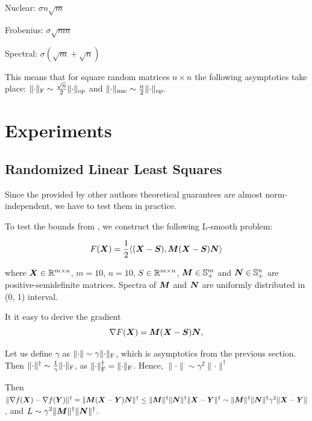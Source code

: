 \documentclass{article} %
\newcommand{\norm}[1]{\lVert #1\rVert}
\newcommand{\Rmn}{\R^{m\times n}}
\DeclarePairedDelimiter{\normf}{\|}{\|_\mathrm{F}}
\DeclarePairedDelimiter{\norms}{\|}{\|_{\mathrm{op}}}
\DeclarePairedDelimiter{\normn}{\|}{\|_{\mathrm{nuc}}}
\def\<#1,#2>{\langle #1,#2\rangle}
\begin{document}
    Nuclear: $\sigma n \sqrt{m}$

    Frobenius: $\sigma \sqrt{m n}$
    
    Spectral: $\sigma(\sqrt{m} + \sqrt{n})$

    This means that for square random matrices $n \times n$  the following asymptotics take place: $\normf{\cdot} \sim \frac{\sqrt{n}}{2}\norms{\cdot}$ and $\normn{\cdot} \sim \frac{n}{2}\norms{\cdot}$.


\section{Experiments}
    \subsection{Randomized Linear Least Squares}
    Since the provided by other authors \citep{kovalev2025understanding,riabinin2025gluon} theoretical guarantees are almost norm-independent, we have to test them in practice.

    To test the bounds from \citet{kovalev2025understanding}, we construct the following L-smooth problem:

    \begin{equation}\label{eq:lls}
        F(\mX) = \frac{1}{2} \<(\mX-\mS), \mM (\mX - \mS) \mN>
    \end{equation}

    where $\mX \in \Rmn$, $m=10$, $n=10$, $S \in \Rmn$, ${\bm{M}} \in \mathbb{S}^m_{+}$ and ${\bm{N}} \in \mathbb{S}^n_{+}$ are positive-semidefinite matrices. Spectra of ${\bm{M}}$ and ${\bm{N}}$ are uniformly distributed in (0, 1) interval.

    It it easy to derive the gradient
    \begin{equation}\label{eq:grad_lls}
        \nabla F({\bm{X}}) = {\bm{M}} ({\bm{X}} - {\bm{S}}) {\bm{N}},
    \end{equation}

    Let us define $\gamma$ as $\norm{\cdot} \sim \gamma \normf{\cdot}$, which is asymptotics from the previous section. Then $\norm{\cdot}^\dagger \sim \frac{1}{\gamma}\normf{\cdot}$, as $\normf{\cdot}^\dagger = \normf{\cdot}$. Hence, $\norm{\cdot} \sim \gamma^2 \norm{\cdot}^\dagger$

    Then $\norm{\nabla f(\mX) - \nabla f(\mY)}^\dagger = \norm{\mM (\mX - \mY) \mN}^\dagger \leq \norm{\mM}^\dagger \norm{\mN}^\dagger \norm{\mX - \mY}^\dagger \sim \norm{\mM}^\dagger \norm{\mN}^\dagger \gamma^2 \norm{\mX - \mY}$, and $L \sim \gamma^2 \norm{\mM}^\dagger \norm{\mN}^\dagger$.
    
\end{document}
